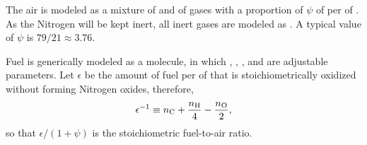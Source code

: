     The air is modeled as a mixture of  and of  gases with a proportion of  $\psi$  {\kilo\mole}  of    per
    {\kilo\mole} of . As the Nitrogen will be kept inert, all inert gases are modeled as  .  A  typical  value  of
    $\psi$ is $79/21 \approx 3.76$.

    Fuel is generically modeled as a  mol\-e\-cule, in which \NC, \NH, \NO,  and  {\NN}  are  adjustable
    parameters. Let $\epsilon$ be the amount of fuel per {\kilo\mole} of  that  is  stoichiometrically  oxidized  without
    forming Nitrogen oxides, therefore,%
    \begin{equation}
        \epsilon^{-1} \equiv \NC + \frac{\NH}{4} - \frac{\NO}{2},
        \label{eq:epsilon}
    \end{equation}
    \noindent so that $\epsilon / (1 + \psi)$ is the stoichiometric fuel-to-air ratio.

